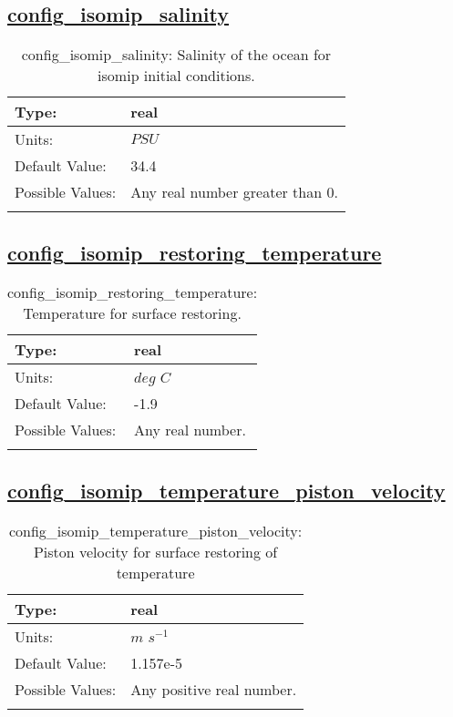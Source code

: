 \subsection[config\_isomip\_salinity]{\hyperref[sec:nm_tab_isomip]{config\_isomip\_salinity}}
\label{subsec:nm_sec_config_isomip_salinity}
\begin{center}
\begin{longtable}{| p{2.0in} || p{4.0in} |}
    \hline
    Type: & real \\
    \hline
    Units: & $PSU$ \\
    \hline
    Default Value: & 34.4 \\
    \hline
    Possible Values: & Any real number greater than 0. \\
    \hline
    \caption{config\_isomip\_salinity: Salinity of the ocean for isomip initial conditions.}
\end{longtable}
\end{center}
\subsection[config\_isomip\_restoring\_temperature]{\hyperref[sec:nm_tab_isomip]{config\_isomip\_restoring\_temperature}}
\label{subsec:nm_sec_config_isomip_restoring_temperature}
\begin{center}
\begin{longtable}{| p{2.0in} || p{4.0in} |}
    \hline
    Type: & real \\
    \hline
    Units: & $deg$ $C$ \\
    \hline
    Default Value: & -1.9 \\
    \hline
    Possible Values: & Any real number. \\
    \hline
    \caption{config\_isomip\_restoring\_temperature: Temperature for surface restoring.}
\end{longtable}
\end{center}
\subsection[config\_isomip\_temperature\_piston\_velocity]{\hyperref[sec:nm_tab_isomip]{config\_isomip\_temperature\_piston\_velocity}}
\label{subsec:nm_sec_config_isomip_temperature_piston_velocity}
\begin{center}
\begin{longtable}{| p{2.0in} || p{4.0in} |}
    \hline
    Type: & real \\
    \hline
    Units: & $m$ $s^{-1}$ \\
    \hline
    Default Value: & 1.157e-5 \\
    \hline
    Possible Values: & Any positive real number. \\
    \hline
    \caption{config\_isomip\_temperature\_piston\_velocity: Piston velocity for surface restoring of temperature}
\end{longtable}
\end{center}
